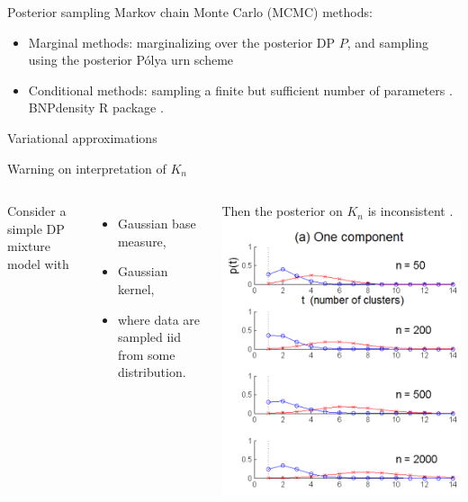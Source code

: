 \begin{frame}{Posterior sampling}
Markov chain Monte Carlo (MCMC) methods:
\begin{itemize}
\item \alert{Marginal methods}: marginalizing over the posterior DP $P$, and sampling using the posterior P\'olya urn scheme \citep[easy in conjugate case, see][]{neal2000markov}
\item \alert{Conditional methods}: sampling a finite but sufficient number of parameters
 \citep{ishwaran2001gibbs}. \alert{BNPdensity} R package \citep{arbel2021BNPdensity}.
\end{itemize}
Variational approximations \citep{blei2006variational}
\end{frame}



\begin{frame}[allowframebreaks]{Warning on interpretation of $K_n$}
\begin{columns}


	Consider a simple DP mixture model with
	\begin{itemize}
		\item  Gaussian base measure, 
		\item Gaussian kernel,
		\item where data are sampled  iid from some distribution.
	\end{itemize}
	
Then the \alert{posterior on $K_n$ is inconsistent} \citep{miller2013simple}.
\includegraphics[width=\textwidth]{figures_julyan/mixtures/miller_DP}
\end{columns}
\framebreak


\end{frame}

